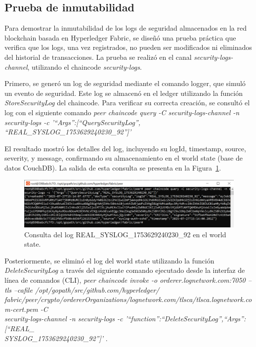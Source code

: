\subsection{Prueba de inmutabilidad}
Para demostrar la inmutabilidad de los logs de seguridad almacenados en la red blockchain basada en Hyperledger Fabric, se diseñó una prueba práctica que verifica que los logs, una vez registrados, no pueden ser modificados ni eliminados del historial de transacciones. La prueba se realizó en el canal \textit{security-logs-channel}, utilizando el chaincode \textit{security-logs}.

Primero, se generó un log de seguridad mediante el comando logger, que simuló un evento de seguridad. Este log se almacenó en el ledger utilizando la función \textit{StoreSecurityLog} del chaincode. Para verificar su correcta creación, se consultó el log con el siguiente comando \textit{peer chaincode query -C security-logs-channel -n security-logs -c '{“Args”:[“QuerySecurityLog”,\\“REAL\_SYSLOG\_1753629240230\_92”]}'}

El resultado mostró los detalles del log, incluyendo su logId, timestamp, source, severity, y message, confirmando su almacenamiento en el world state (base de datos CouchDB). La salida de esta consulta se presenta en la Figura~\ref{fig:log-consultado}.

\begin{figure}[H]
    \centering
    \includegraphics[width=1\textwidth]{figuras/log-consultado.png}
    \caption{Consulta del log REAL\_SYSLOG\_1753629240230\_92 en el world state.}
    \label{fig:log-consultado}
\end{figure}

Posteriormente, se eliminó el log del world state utilizando la función \textit{DeleteSecurityLog} a través del siguiente comando ejecutado desde la interfaz de línea de comandos (CLI),  \textit{peer chaincode invoke -o orderer.lognetwork.com:7050 --tls --cafile /opt/gopath/src/github.com/hyperledger/\\fabric/peer/crypto/ordererOrganizations/lognetwork.com/tlsca/tlsca.lognetwork.com-cert.pem -C \\security-logs-channel -n security-logs -c '{“function”:“DeleteSecurityLog”,“Args”:[“REAL\_\\SYSLOG\_1753629240230\_92”]}'} .

